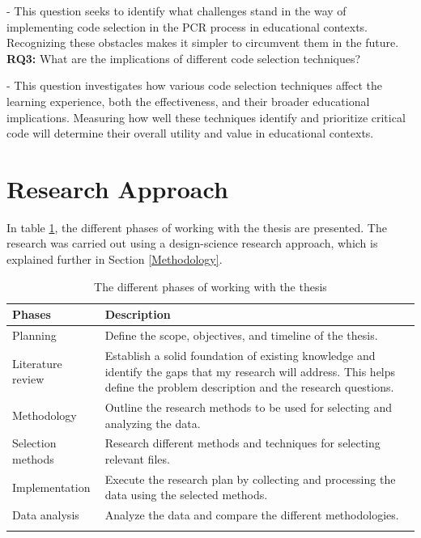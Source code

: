 - This question seeks to identify what challenges stand in the way of implementing code selection in the PCR process in educational contexts. Recognizing these obstacles makes it simpler to circumvent them in the future.\\


\noindent\textbf{RQ3:} What are the implications of different code selection techniques?

- This question investigates how various code selection techniques affect the learning experience, both the effectiveness, and their broader educational implications. Measuring how well these techniques identify and prioritize critical code will determine their overall utility and value in educational contexts.\\


\section{Research Approach}
In table \ref{tab:Research Approach}, the different phases of working with the thesis are presented. The research was carried out using a design-science research approach, which is explained further in Section \ref{Methodology}. \\

\begin{table}[H]
  \centering
  \begin{tabularx}{\textwidth}{>{\hsize=0.5\hsize}X >{\hsize=1.5\hsize}X}
    \textbf{Phases} & \textbf{Description} \\ [1ex] \hline 
    Planning & Define the scope, objectives, and timeline of the thesis. \\ [1ex]
    
    Literature review & Establish a solid foundation of existing knowledge and identify the gaps that my research will address. This helps define the problem description and the research questions. \\ [1ex] 
    
    Methodology & Outline the research methods to be used for selecting and analyzing the data. \\ [1ex]
    
    Selection methods & Research different methods and techniques for selecting relevant files. \\ [1ex]
    
    Implementation & Execute the research plan by collecting and processing the data using the selected methods. \\ [1ex]
    
    Data analysis & Analyze the data and compare the different methodologies. \\ [1ex]
    \\ \hline
    
  \end{tabularx}
  \caption{The different phases of working with the thesis}
  \label{tab:Research Approach}
\end{table}


